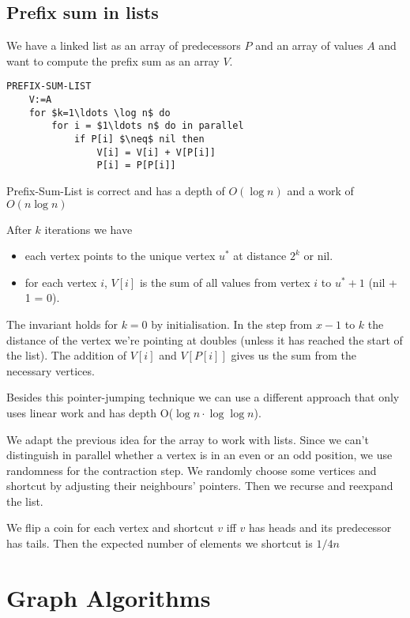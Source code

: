 \subsection{Prefix sum in lists}
We have a linked list as an array of predecessors $P$ and an array of values $A$ and want to compute the prefix sum as an array $V$.

\begin{lstlisting}
PREFIX-SUM-LIST
	V:=A
	for $k=1\ldots \log n$ do
		for i = $1\ldots n$ do in parallel
			if P[i] $\neq$ nil then
				V[i] = V[i] + V[P[i]]
				P[i] = P[P[i]]
\end{lstlisting}

\begin{thm} Prefix-Sum-List is correct and has a depth of $O(\log n)$ and a work of $O(n\log n)$\end{thm}

\begin{pr}After $k$ iterations we have
\begin{itemize}
\item each vertex points to the unique vertex $u^*$ at distance $2^k$ or nil.
\item for each vertex $i$, $V[i]$ is the sum of all values from vertex $i$ to $u^*+1$ (nil + 1 = 0). 
\end{itemize}

The invariant holds for $k=0$ by initialisation. In the step from $x-1$ to $k$ the distance of the vertex we're pointing at doubles (unless it has reached the start of the list). The addition of $V[i]$ and $V[P[i]]$ gives us the sum from the necessary vertices.
\end{pr}

Besides this pointer-jumping technique we can use a different approach that only uses linear work and has depth O($\log n \cdot \log \log n$).

We adapt the previous idea for the array to work with lists. Since we can't distinguish in parallel whether a vertex is in an even or an odd position, we use randomness for the contraction step. We randomly choose some vertices and shortcut by adjusting their neighbours' pointers. Then we recurse and reexpand the list.

We flip a coin for each vertex and shortcut $v$ iff $v$ has heads and its predecessor has tails. Then the expected number of elements we shortcut is $1/4n$

\section{Graph Algorithms}

